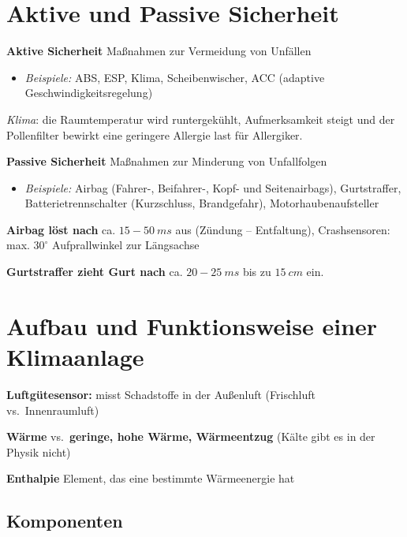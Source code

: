 \section{Aktive und Passive
Sicherheit}\label{aktive-und-passive-sicherheit}

\textbf{Aktive Sicherheit} Maßnahmen zur Vermeidung von Unfällen

\begin{itemize}
\item
  \emph{Beispiele:} ABS, ESP, Klima, Scheibenwischer, ACC (adaptive
  Geschwindigkeitsregelung)
\end{itemize}

\emph{Klima}: die Raumtemperatur wird runtergekühlt, Aufmerksamkeit
steigt und der Pollenfilter bewirkt eine geringere Allergie last für
Allergiker.

\textbf{Passive Sicherheit} Maßnahmen zur Minderung von Unfallfolgen

\begin{itemize}
\item
  \emph{Beispiele:} Airbag (Fahrer-, Beifahrer-, Kopf- und
  Seitenairbags), Gurtstraffer, Batterietrennschalter (Kurzschluss,
  Brandgefahr), Motorhaubenaufsteller
\end{itemize}

\textbf{Airbag löst nach} ca. $15 - 50~ms$ aus (Zündung --
Entfaltung), Crashsensoren: max. $30^\circ$ Aufprallwinkel zur
Längsachse

\textbf{Gurtstraffer zieht Gurt nach} ca. $20 - 25~ms$ bis zu
$15~cm$ ein.

\newpage

\section{Aufbau und Funktionsweise einer
Klimaanlage}\label{aufbau-und-funktionsweise-einer-klimaanlage}

\textbf{Luftgütesensor:} misst Schadstoffe in der Außenluft (Frischluft
vs.~Innenraumluft)

\textbf{Wärme} vs.~\textbf{geringe, hohe Wärme, Wärmeentzug} (Kälte gibt
es in der Physik nicht)

\textbf{Enthalpie} Element, das eine bestimmte Wärmeenergie hat

\subsection{Komponenten}\label{komponenten}

